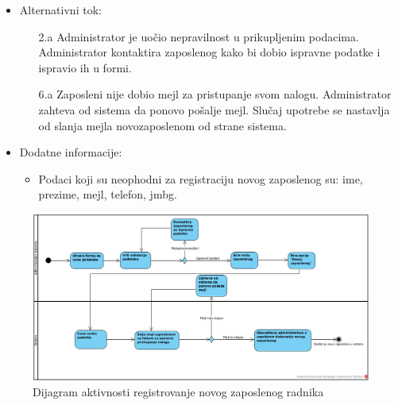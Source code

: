 \begin{itemize}
    \item Alternativni tok:
        \begin{itemize}
            \item[2.a] Administrator je uočio nepravilnost u prikupljenim podacima. Administrator kontaktira zaposlenog kako bi dobio ispravne podatke i ispravio ih u formi.
            \item[6.a] Zaposleni nije dobio mejl za pristupanje svom nalogu. Administrator zahteva od sistema da ponovo pošalje mejl. Slučaj upotrebe se nastavlja od slanja mejla novozaposlenom od strane sistema.
        \end{itemize}
    \item Dodatne informacije:
        \begin{itemize}
            \item Podaci koji su neophodni za registraciju novog zaposlenog su: ime, prezime, mejl, telefon, jmbg.
        \end{itemize}
\end{itemize}

\begin{figure}[H]
\begin{center}
\includegraphics[width=\textwidth]{Pictures/activity_employee_registration.png}
\end{center}
    \caption{Dijagram aktivnosti registrovanje novog zaposlenog radnika}
\label{fig:ActivityEmployeeRegistration}
\end{figure}
